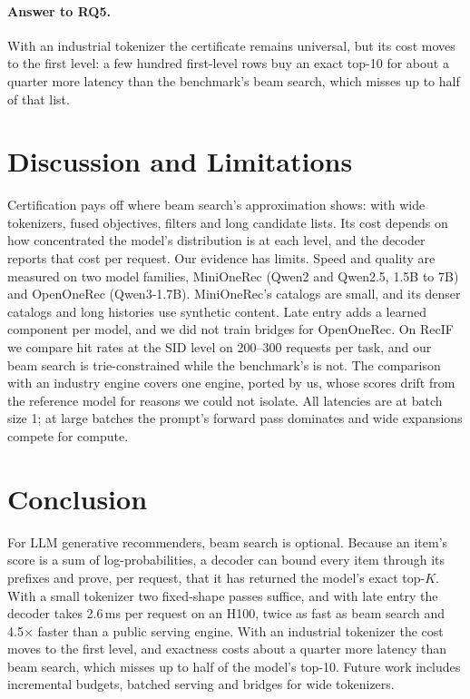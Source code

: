 \documentclass[sigconf,anonymous]{acmart}
\begin{document}
\paragraph{Answer to RQ5.} With an industrial tokenizer the certificate remains universal, but its cost moves to the
first level: a few hundred first-level rows buy an exact top-10 for about a quarter more latency than the
benchmark's beam search, which misses up to half of that list.

\section{Discussion and Limitations}
\label{sec:limitations}

Certification pays off where beam search's approximation shows: with wide tokenizers, fused objectives, filters and
long candidate lists. Its cost depends on how concentrated the model's distribution is at each level, and the
decoder reports that cost per request. Our evidence has limits. Speed and quality are measured on two model
families, MiniOneRec (Qwen2 and Qwen2.5, 1.5B to 7B) and OpenOneRec (Qwen3-1.7B). MiniOneRec's catalogs are small,
and its denser catalogs and long histories use synthetic content. Late entry adds a learned component per model,
and we did not train bridges for OpenOneRec. On RecIF we compare hit rates at the SID level on 200--300 requests per
task, and our beam search is trie-constrained while the benchmark's is not. The comparison with an industry engine
covers one engine, ported by us, whose scores drift from the reference model for reasons we could not
isolate. All latencies are at batch size 1; at large batches the prompt's forward pass dominates and wide
expansions compete for compute.

\section{Conclusion}
For LLM generative recommenders, beam search is optional. Because an item's score is a sum of log-probabilities, a
decoder can bound every item through its prefixes and prove, per request, that it has returned the model's exact
top-$K$. With a small tokenizer two fixed-shape passes suffice, and with late entry the decoder takes 2.6\,ms per
request on an H100, twice as fast as beam search and 4.5$\times$ faster than a public serving engine. With an
industrial tokenizer the cost moves to the first level, and exactness costs about a quarter more latency than beam
search, which misses up to half of the model's top-10. Future work includes incremental budgets, batched serving
and bridges for wide tokenizers.
\end{document}

